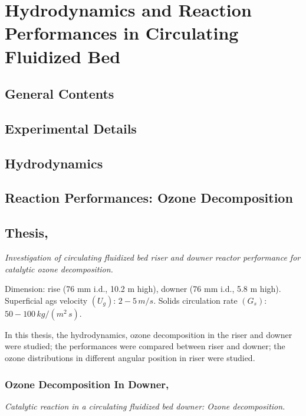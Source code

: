%
%
%
\chapter{Hydrodynamics and Reaction Performances in Circulating Fluidized Bed}
\section{General Contents}

\section{Experimental Details}

\section{Hydrodynamics}

\section{Reaction Performances: Ozone Decomposition}



\section[Li, Dongbing, 2010]{Thesis, \citep{li2010}}
\textit{Investigation of circulating fluidized bed riser and downer reactor performance for catalytic ozone decomposition.}

Dimension: rise (76 mm i.d., 10.2 m high), downer (76 mm i.d., 5.8 m high). Superficial ags velocity $(U_g)$: $2-5\,\si{m/s}$. 
Solids circulation rate $(G_s)$: $50-100\,\si{kg/(m^2\,s)}$.

In this thesis, the hydrodynamics, ozone decomposition in the riser and downer were studied; 
the performances were compared between riser and downer; 
the ozone distributions in different angular position in riser were studied.

\subsection[Ozone Decomposition In Downer, 2011]{Ozone Decomposition In Downer, \citep{li2011catalytic}}
\textit{Catalytic reaction in a circulating fluidized bed downer: Ozone decomposition.}
